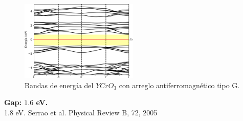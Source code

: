 \begin{frame}
    \begin{figure}[H]
        \centering
        \includegraphics[width=0.5\textwidth]{contenido/resultados/img_resultados/YCO_bandas_G.png}
        \caption{Bandas de energ\'ia del $YCrO_{3}$ con arreglo 
            antiferromagn\'etico tipo G.}
    \end{figure}
    \centering
    \textbf{Gap: $1.6$ eV.} \\
    {\scriptsize 1.8 eV. Serrao et al. Physical Review B, 72, 2005 }
\end{frame}

